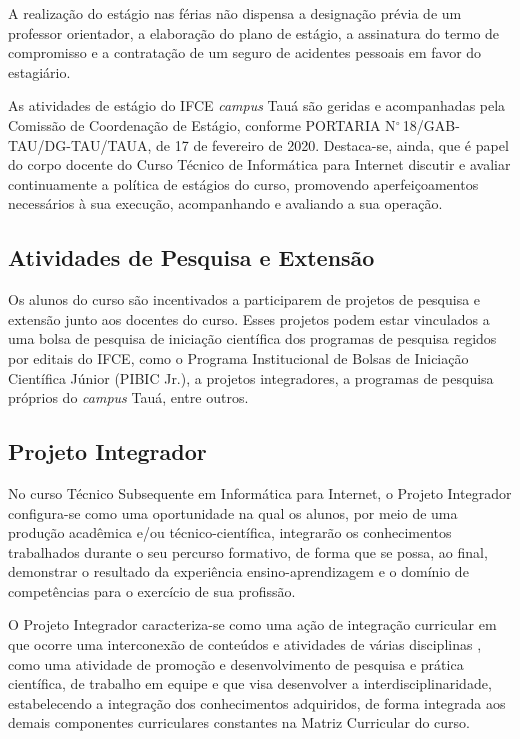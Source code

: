 \documentclass[
	12pt,				%
	openright,			%
	twoside,			%
	a4paper,			%
	chapter=TITLE,		%
	english,			%
	french,				%
	spanish,			%
	brazil,				%
	]{abntex2}
\begin{document}
A realização do estágio nas férias não dispensa a designação prévia de um
professor orientador, a elaboração do plano de estágio, a assinatura do termo de compromisso e a contratação de um seguro de acidentes pessoais em favor do estagiário.

As atividades de estágio do IFCE \textit{campus} Tauá são geridas e acompanhadas pela Comissão de Coordenação de Estágio, conforme  PORTARIA N$^\circ$\,18/GAB-TAU/DG-TAU/TAUA, de 17 de fevereiro de 2020. Destaca-se, ainda, que é papel do corpo docente do Curso Técnico de Informática para Internet discutir e avaliar continuamente a política de estágios do curso, promovendo aperfeiçoamentos necessários à sua execução, acompanhando e avaliando a sua operação.


\subsection{Atividades de Pesquisa e Extensão}
Os alunos do curso são incentivados a participarem de projetos de pesquisa e extensão junto aos docentes do curso. Esses projetos podem estar vinculados a uma bolsa de pesquisa de iniciação científica dos programas de pesquisa regidos por editais do IFCE, como o  Programa Institucional de Bolsas de Iniciação Científica Júnior (PIBIC Jr.), a projetos integradores, a programas de pesquisa próprios do \textit{campus} Tauá, entre outros. 


\subsection{Projeto Integrador}


No curso Técnico Subsequente em Informática para Internet, o Projeto Integrador configura-se como uma oportunidade na qual os alunos, por meio de uma produção acadêmica e/ou técnico-científica, integrarão os conhecimentos trabalhados durante o seu percurso formativo, de forma que se possa, ao final, demonstrar o resultado da experiência ensino-aprendizagem e o domínio de competências para o exercício de sua profissão.

O Projeto Integrador caracteriza-se como uma ação de integração curricular em que ocorre uma interconexão de conteúdos e atividades de várias disciplinas \cite{pj}, como uma atividade de promoção e desenvolvimento de pesquisa e prática científica, de trabalho em equipe e que visa desenvolver a interdisciplinaridade, estabelecendo a integração dos conhecimentos adquiridos, de forma integrada aos demais componentes curriculares constantes na Matriz Curricular do curso.
\end{document}
